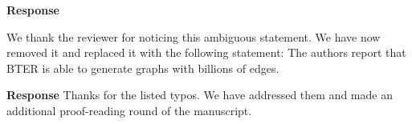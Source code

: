 \documentclass[a4paper,twoside,11pt]{reviewresponse}
\begin{document}

\textbf{Response}

We thank the reviewer for noticing this ambiguous statement. We have now removed it and replaced it with the following 
statement: The authors report that BTER is able to generate graphs with billions of edges. 

\textbf{Response}
Thanks for the listed typos. We have addressed them and made an additional proof-reading round of the manuscript.



%
%
\end{document}
